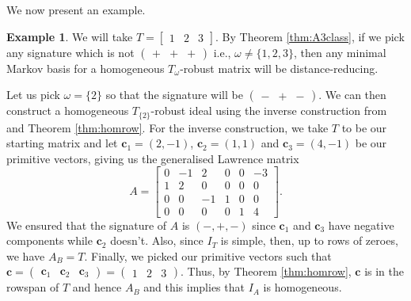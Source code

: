 \documentclass[a4paper, 12pt]{article}
\theoremstyle{plain}
\theoremstyle{definition}
\newtheorem{example}[theorem]{Example}
\theoremstyle{remark}
\begin{document}
We now present an example.

\begin{example} \label{ex: A3}
    We will take $T=\begin{bmatrix}1&2&3\end{bmatrix}$. By Theorem \ref{thm:A3class}, if we pick any signature which is not $\begin{pmatrix}+&+&+\end{pmatrix}$ i.e., $\omega \neq \{1,2,3\}$, then any minimal Markov basis for a homogeneous $T_{\omega}$-robust matrix will be distance-reducing.

    Let us pick $\omega=\{2\}$ so that the signature will be $\begin{pmatrix}-&+&-\end{pmatrix}$. We can then construct a homogeneous $T_{\{2\}}$-robust ideal using the inverse construction from \cite[Section 2]{petrovic2018bouquet} and Theorem \ref{thm:homrow}. For the inverse construction, we take $T$ to be our starting matrix and let $\mathbf{c}_1=(2,-1)$, $\mathbf{c}_2=(1,1)$ and $\mathbf{c}_3=(4,-1)$ be our primitive vectors, giving us the generalised Lawrence matrix  
    $$A=\begin{bmatrix}
        0&-1&2&0&0&-3 \\
        1&2&0&0&0&0\\
        0&0&-1&1&0&0\\
        0&0&0&0&1&4
    \end{bmatrix}.$$
    We ensured that the signature of $A$ is $(-,+,-)$ since $\mathbf{c}_1$ and $\mathbf{c}_3$ have negative components while $\mathbf{c}_2$ doesn't. Also, since $I_T$ is simple, then, up to rows of zeroes, we have $A_B=T$. Finally, we picked our primitive vectors such that $\mathbf{c}=\begin{pmatrix}\mathbf{c}_1&\mathbf{c}_2&\mathbf{c}_3\end{pmatrix}=\begin{pmatrix}1&2&3\end{pmatrix}$. Thus, by Theorem \ref{thm:homrow}, $\mathbf{c}$ is in the rowspan of $T$ and hence $A_B$ and this implies that $I_A$ is homogeneous.
    
    

\end{example}
\end{document}
